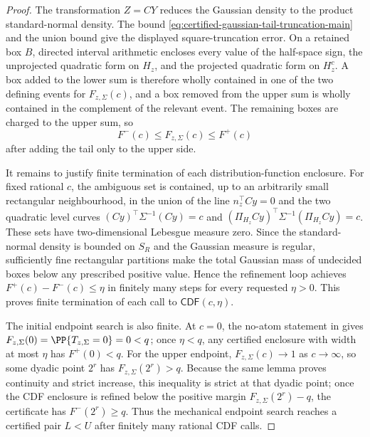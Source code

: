 \begin{proof}
The transformation \(Z=CY\) reduces the Gaussian density to the product
standard-normal density.  The bound
\eqref{eq:certified-gaussian-tail-truncation-main} and the union bound give
the displayed square-truncation error.  On a retained box \(B\), directed
interval arithmetic encloses every value of the half-space sign, the
unprojected quadratic form on \(H_z\), and the projected quadratic form on
\(H_z^c\).  A box added to the lower sum is therefore wholly contained in one
of the two defining events for \(F_{z,\Sigma}(c)\), and a box removed from the
upper sum is wholly contained in the complement of the relevant event.  The
remaining boxes are charged to the upper sum, so
\[
F^-(c)\le F_{z,\Sigma}(c)\le F^+(c)
\]
after adding the tail only to the upper side.

It remains to justify finite termination of each distribution-function
enclosure.  For fixed rational \(c\), the ambiguous set
is contained, up to an arbitrarily small rectangular neighbourhood, in the
union of the line \(n_z^\top C y=0\) and the two quadratic level curves
\((Cy)^\top\Sigma^{-1}(Cy)=c\) and
\((\Pi_{H_z}Cy)^\top\Sigma^{-1}(\Pi_{H_z}Cy)=c\).  These sets have
two-dimensional Lebesgue measure zero.  Since the standard-normal density is
bounded on \(S_R\) and the Gaussian measure is regular, sufficiently fine
rectangular partitions make the total Gaussian mass of undecided boxes below
any prescribed positive value.  Hence the refinement loop achieves
\(F^+(c)-F^-(c)\le\eta\) in finitely many steps for every requested
\(\eta>0\).  This proves finite termination of each call to
\(\mathsf{CDF}(c,\eta)\).

The initial endpoint search is also finite.  At \(c=0\), the no-atom
statement in 
gives \(F_{z,\Sigma}(0)=\PP\{T_{z,\Sigma}=0\}=0<q\); once
\(\eta<q\), any certified enclosure with width at most \(\eta\) has
\(F^+(0)<q\).  For the upper endpoint,
\(F_{z,\Sigma}(c)\to1\) as \(c\to\infty\), so some dyadic point \(2^r\) has
\(F_{z,\Sigma}(2^r)>q\).  Because the same lemma proves continuity and
strict increase, this inequality is strict at that dyadic point; once the CDF
enclosure is refined below the positive margin
\(F_{z,\Sigma}(2^r)-q\), the certificate has \(F^-(2^r)\ge q\).  Thus the
mechanical endpoint search reaches a certified pair \(L<U\) after finitely
many rational CDF calls.


\end{proof}
